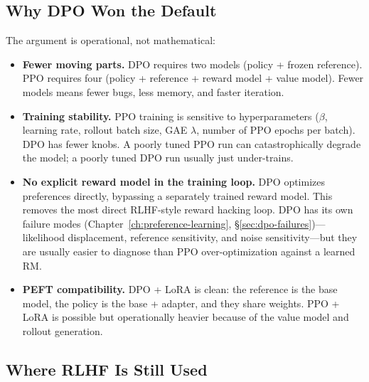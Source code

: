 \subsection{Why DPO Won the Default}

The argument is operational, not mathematical:

\begin{itemize}[nosep]
  \item \textbf{Fewer moving parts.} DPO requires two models (policy + frozen reference). PPO requires four (policy + reference + reward model + value model). Fewer models means fewer bugs, less memory, and faster iteration.
  \item \textbf{Training stability.} PPO training is sensitive to hyperparameters ($\beta$, learning rate, rollout batch size, GAE $\lambda$, number of PPO epochs per batch). DPO has fewer knobs. A poorly tuned PPO run can catastrophically degrade the model; a poorly tuned DPO run usually just under-trains.
  \item \textbf{No explicit reward model in the training loop.} DPO optimizes preferences directly, bypassing a separately trained reward model. This removes the most direct RLHF-style reward hacking loop. DPO has its own failure modes (Chapter~\ref{ch:preference-learning}, \S\ref{sec:dpo-failures})---likelihood displacement, reference sensitivity, and noise sensitivity---but they are usually easier to diagnose than PPO over-optimization against a learned RM.
  \item \textbf{PEFT compatibility.} DPO + LoRA is clean: the reference is the base model, the policy is the base + adapter, and they share weights. PPO + LoRA is possible but operationally heavier because of the value model and rollout generation.
\end{itemize}

\subsection{Where RLHF Is Still Used}

